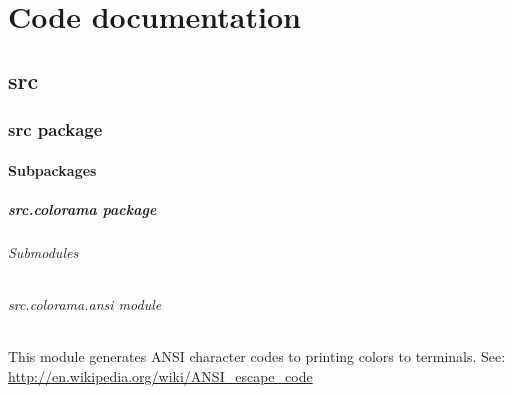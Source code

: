 \documentclass[a4paper,10pt,english]{sphinxmanual}
\begin{document}
\chapter{Code documentation}
\label{index:code-documentation}

\section{src}
\label{commands/apidoc/modules:src}\label{commands/apidoc/modules::doc}

\subsection{src package}
\label{commands/apidoc/src::doc}\label{commands/apidoc/src:src-package}

\subsubsection{Subpackages}
\label{commands/apidoc/src:subpackages}

\paragraph{src.colorama package}
\label{commands/apidoc/src.colorama:src-colorama-package}\label{commands/apidoc/src.colorama::doc}

\subparagraph{Submodules}
\label{commands/apidoc/src.colorama:submodules}

\subparagraph{src.colorama.ansi module}
\label{commands/apidoc/src.colorama:module-src.colorama.ansi}\label{commands/apidoc/src.colorama:src-colorama-ansi-module}
This module generates ANSI character codes to printing colors to terminals.
See: \url{http://en.wikipedia.org/wiki/ANSI\_escape\_code}
\end{document}
